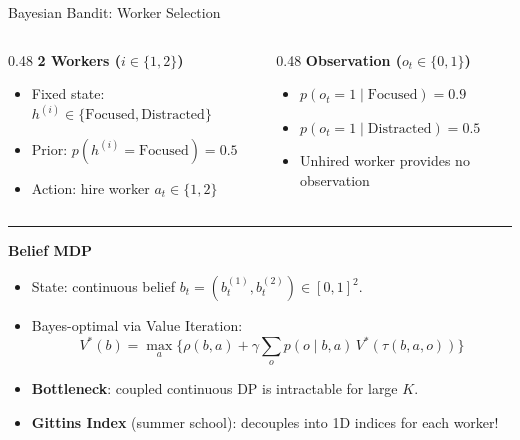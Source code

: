 \documentclass[18pt,aspectratio=149]{beamer}
\begin{document}
\begin{frame}{Bayesian Bandit: Worker Selection}
    \begin{columns}[T,onlytextwidth]
        \begin{column}{0.48\textwidth}
            \textbf{2 Workers ($i \in \{1, 2\}$)}
            \begin{itemize}
                \item Fixed state: $h^{(i)} \in \{\text{Focused}, \text{Distracted}\}$
                \item Prior: $p(h^{(i)} = \text{Focused}) = 0.5$
                \item Action: hire worker $a_t \in \{1, 2\}$
            \end{itemize}
        \end{column}

        \begin{column}{0.48\textwidth}
            \textbf{Observation ($o_t \in \{0, 1\}$)}
            \begin{itemize}
                \item $p(o_t = 1 \mid \text{Focused}) = 0.9$
                \item $p(o_t = 1 \mid \text{Distracted}) = 0.5$
                \item Unhired worker provides no observation
            \end{itemize}
        \end{column}
    \end{columns}

    \vspace{0.6em}
    \hrule
    \vspace{0.6em}

    \textbf{Belief MDP}
    \begin{itemize}
        \item State: continuous belief $b_t = (b_t^{(1)}, b_t^{(2)}) \in [0, 1]^2$.
        \item Bayes-optimal via Value Iteration:
        \[
            V^*(b) = \max_{a} \Big\{ \rho(b, a) + \gamma \sum_o p(o \mid b, a) \, V^*(\tau(b, a, o)) \Big\}
        \]
        \vspace{-1.5em}
        \item \textbf{Bottleneck}: coupled continuous DP is intractable for large $K$.
        \item \textbf{Gittins Index} (summer school): decouples into 1D indices for each worker!
    \end{itemize}
\end{frame}
\end{document}
